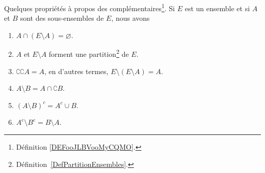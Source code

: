 \begin{lemma}       \label{LemPropsComplement}
	Quelques propriétés à propos des complémentaires\footnote{Définition \ref{DEFooJLBVooMyCQMO}.}. Si \( E\) est un ensemble et si \( A\) et \( B\) sont des sous-ensembles de \( E\), nous avons
	\begin{enumerate}
 		\item       \label{ITEMooComplementDisjoint}
   			\(A \cap ( E \setminus A) = \varnothing \).
      		\item       \label{ITEMooComplementPartition}
			\( A \) et \( E \setminus A \) forment une partition\footnote{Définition~\ref{DefPartitionEnsembles}.} de \( E \). 
		\item       \label{ITEMooWIYBooKMLVnZ}
		      \( \complement \complement A =A\), en d'autres termes, \( E\setminus(E\setminus A)=A\).
		\item       \label{ItemLemPropComplementiii}
		      \( A\setminus B=A\cap\complement B\).
		\item       \label{ITEMooNHDUooWtURqQ}
		      \( (A\setminus B)^c=A^c\cup B\).
		\item       \label{ITEMooTBWKooTChOmC}
		      \( A^c\setminus B^c=B\setminus A\).
	\end{enumerate}
\end{lemma}

